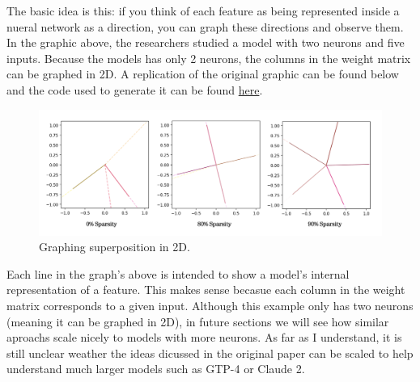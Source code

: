\documentclass{article} %
\begin{document}
The basic idea is this: if you think of each feature as being represented inside a
nueral network as a direction, you can graph these directions and observe them.
In the graphic above, the researchers studied a model with two neurons and five inputs.
Because the models has only 2 neurons, the columns in the weight matrix can be graphed in 2D.
A replication of the original graphic can be found below and the code used to 
generate it can be found \href{https://github.com/zroe1/toy_models_of_superposition/blob/main/section_1/section_1.ipynb}{here}. 

\begin{figure}[h]
    \centering
    \includegraphics[width=0.68\linewidth]{section_1/images/section1_replicated_graphic.png}
    \captionsetup{font=footnotesize} %
    \caption{Graphing superposition in 2D.}
    \label{fig:section1_replication}
\end{figure}

Each line in the graph's above is intended to show a model's internal representation
of a feature. This makes sense becasue each column in the weight matrix
corresponds to a given input. Although this example only has two neurons (meaning 
it can be graphed in 2D), in future sections we will see how similar aproachs 
scale nicely to models with more neurons. As far as I understand, it is still 
unclear weather the ideas dicussed in the original paper can be scaled to help 
understand much larger models such as GTP-4 or Claude 2.
\end{document}
